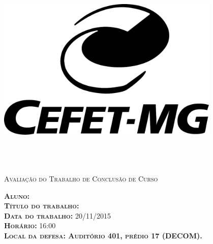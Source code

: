 %
%



%
%

\makeatletter
\begin{folhadeaprovacao}
		\hspace{-2.0cm}
	    \begin{minipage}{0.19\textwidth}
	    	\includegraphics[width=0.8\textwidth]{./04-figuras/cefet-logo}
	    \end{minipage}
	    \quad
	    \hspace{-1.5cm}
	    \begin{minipage}{.9\textwidth}
	    	\begin{center}	    	
	    	{\normalfont\scshape\textbf\imprimirinstituicao}\\
	    	\normalfont\scshape{\imprimirdepartamento}\\
	    	\normalfont\scshape{\imprimirprograma}\\
	    	{\normalfont\scshape Avalia\c{c}\~ao do Trabalho de Conclusão de Curso}\\
	    	\end{center}
	    \end{minipage}
	
	\vspace*{50pt}
	
	{\noindent\normalfont\scshape\textbf{Aluno:} \imprimirautor}\\
	{\normalfont\scshape\textbf{T\'{i}tulo do trabalho:} \imprimirtitulo}\\
	{\normalfont\scshape\textbf{Data do trabalho:} 20/11/2015}\\
	{\normalfont\scshape\textbf{Hor\'{a}rio:} 16:00}\\
	{\normalfont\scshape\textbf{Local da defesa: Audit{\'o}rio 401, pr{\'e}dio 17 (DECOM).} }\\
	

\end{folhadeaprovacao}
